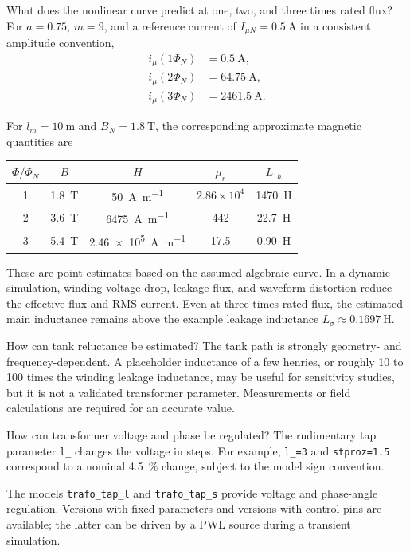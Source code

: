 \begin{formulaBox}{What does the nonlinear curve predict at one, two, and three times rated flux?}
For $a=0.75$, $m=9$, and a reference current of
$I_{\mu N}=\SI{0.5}{\ampere}$ in a consistent amplitude convention,
\begin{align}
i_\mu(1\Phi_N)&=\SI{0.5}{\ampere},\\
i_\mu(2\Phi_N)&=\SI{64.75}{\ampere},\\
i_\mu(3\Phi_N)&=\SI{2461.5}{\ampere}.
\end{align}

For $l_m=\SI{10}{\metre}$ and $B_N=\SI{1.8}{\tesla}$, the corresponding
approximate magnetic quantities are
\begin{table}[H]
\centering
\renewcommand{\arraystretch}{1.12}
\begin{tabular}{ccccc}
\toprule
$\Phi/\Phi_N$ & $B$ & $H$ & $\mu_r$ & $L_{1h}$ \\
\midrule
1 & \SI{1.8}{\tesla} & \SI{50}{\ampere\per\metre} & $2.86\times10^4$ & \SI{1470}{\henry} \\
2 & \SI{3.6}{\tesla} & \SI{6475}{\ampere\per\metre} & 442 & \SI{22.7}{\henry} \\
3 & \SI{5.4}{\tesla} & \SI{2.46e5}{\ampere\per\metre} & 17.5 & \SI{0.90}{\henry} \\
\bottomrule
\end{tabular}
\end{table}

These are point estimates based on the assumed algebraic curve. In a dynamic
simulation, winding voltage drop, leakage flux, and waveform distortion reduce
the effective flux and RMS current. Even at three times rated flux, the
estimated main inductance remains above the example leakage inductance
$L_\sigma\approx\SI{0.1697}{\henry}$.
\end{formulaBox}

\begin{formulaBox}{How can tank reluctance be estimated?}
The tank path is strongly geometry- and frequency-dependent. A placeholder
inductance of a few henries, or roughly 10 to 100 times the winding leakage
inductance, may be useful for sensitivity studies, but it is not a validated
transformer parameter. Measurements or field calculations are required for an
accurate value.
\end{formulaBox}

\begin{formulaBox}{How can transformer voltage and phase be regulated?}
The rudimentary tap parameter \texttt{l\_} changes the voltage in steps. For
example, \texttt{l\_=3} and \texttt{stproz=1.5} correspond to a nominal
\SI{4.5}{\percent} change, subject to the model sign convention.

The models \texttt{trafo\_tap\_l} and \texttt{trafo\_tap\_s} provide voltage
and phase-angle regulation. Versions with fixed parameters and versions with
control pins are available; the latter can be driven by a PWL source during a
transient simulation.
\end{formulaBox}

